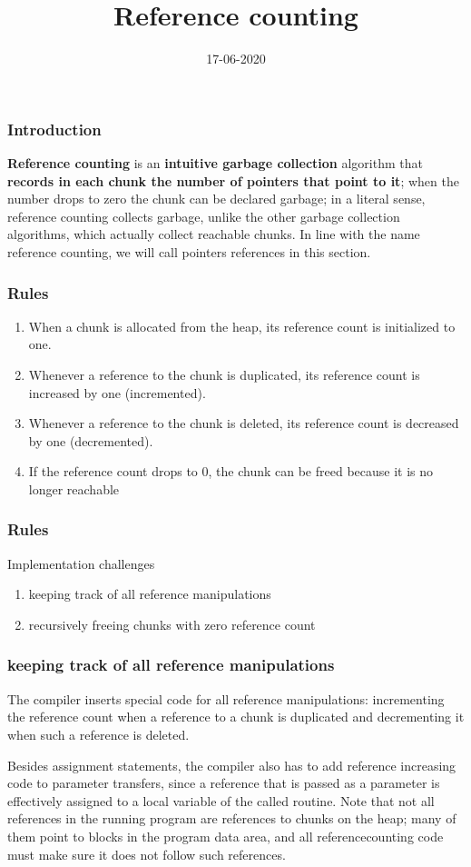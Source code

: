 \documentclass[presentation]{beamer}
\title{Reference counting}
\author[Miroslaw Blazej \&Miroslaw Blazej]
{%
   \texorpdfstring{
        \begin{columns}
            \column{.45\linewidth}
            \centering
            Miroslaw Blazej\\
            \href{mailto:blazej@student.agh.edu.pl}{blazej@student.agh.edu.pl}
            \column{.45\linewidth}
            \centering
            Michal Dygas\\
            \href{mailto:dygas@student.agh.edu.pl}{dygas@student.agh.edu.pl}
        \end{columns}
   }
   {Miroslaw \& Michal}
}
\institute[]{AGH University of Science and Technology}
\date{17-06-2020}
\begin{document}
\begin{frame}
  \titlepage
\end{frame}

\begin{frame}
  \frametitle{Introduction} 
  \justifying
 \textbf{Reference counting} is an \textbf{intuitive garbage collection} algorithm that \textbf{records in
each chunk the number of pointers that point to it}; when the number drops to
zero the chunk can be declared garbage; in a literal sense, reference counting collects garbage, unlike the other garbage collection algorithms, which actually collect
reachable chunks. In line with the name reference counting, we will call pointers
references in this section.
\end{frame}

\begin{frame}
  \frametitle{Rules}
  \justifying
    \begin{enumerate}
    \justifying
        \item When a chunk
is allocated from the heap, its reference count is initialized to one. 
        \item Whenever a
reference to the chunk is duplicated, its reference count is increased by one (incremented).
		\item Whenever a reference to the chunk is deleted, its reference
count is decreased by one (decremented).
		\item If the reference count drops to 0, the
chunk can be freed because it is no longer reachable
    \end{enumerate}  
\end{frame}


\begin{frame}
  \frametitle{Rules}
  \justifying
    \begin{block}{Implementation challenges}
        \begin{enumerate}
            \item keeping track of all
reference manipulations
            \item  recursively freeing chunks with zero reference count
        \end{enumerate}
  	\end{block}
\end{frame}

\begin{frame}
  \frametitle{keeping track of all
reference manipulations}
  \justifying
  The compiler inserts special code for all reference manipulations: incrementing
the reference count when a reference to a chunk is duplicated and decrementing it
when such a reference is deleted. 

	Besides assignment statements,
the compiler also has to add reference increasing code to parameter transfers, since
a reference that is passed as a parameter is effectively assigned to a local variable of
the called routine. Note that not all references in the running program are references to chunks on
the heap; many of them point to blocks in the program data area, and all referencecounting code must make sure it does not follow such references.
\end{frame}
\end{document}
